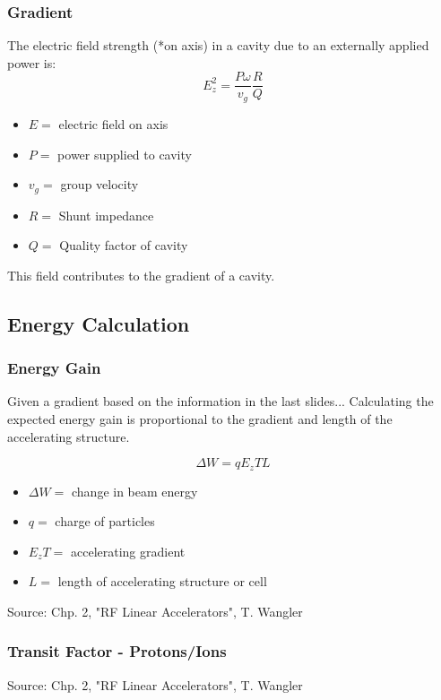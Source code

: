 \documentclass[professionalfonts,t]{beamer}
\begin{document}
\begin{frame}
	\frametitle{Gradient}
	The electric field strength (*on axis) in a cavity 
	due to an externally applied power is:
	\begin{equation}
		E^2_z = \frac{P\omega}{v_g} \frac{R}{Q}
	\end{equation}
	\begin{itemize}
		\item $E =$ electric field on axis
		\item $P =$ power supplied to cavity
		\item $v_g =$ group velocity
		\item $R =$ Shunt impedance 
		\item $Q =$ Quality factor of cavity
	\end{itemize}

\vspace{0.5em}
This field contributes to the gradient of a cavity.
\end{frame}

\subsection{Energy Calculation}
\begin{frame}
\frametitle{Energy Gain}
Given a gradient based on the information in the last slides...
Calculating the expected energy gain is proportional to the gradient and length of the accelerating structure. 

\begin{equation}
	\Delta W = qE_zTL
\end{equation}

\begin{itemize}
	\item $\Delta W = $ change in beam energy
	\item $q =$ charge of particles
	\item $E_zT = $ accelerating gradient
	\item $L = $ length of accelerating structure or cell 
\end{itemize}

\vspace{1em}
Source: Chp. 2, "RF Linear Accelerators", T. Wangler
\end{frame}


\begin{frame}
\frametitle{Transit Factor - Protons/Ions}
\vspace{1em}
Source: Chp. 2, "RF Linear Accelerators", T. Wangler
\end{frame}
\end{document}

